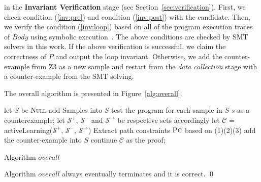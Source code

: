 \begin{itemize}
    in the \textbf{Invariant Verification} stage (see Section~\ref{sec:verification}). 
    First, we check condition (\ref{inv:pre}) and condition (\ref{inv:post}) with the candidate. 
    Then, we verify the condition (\ref{inv:loop}) 
    based on all of the program execution traces of $\mathit{Body}$ using symbolic execution~\cite{}. 
    The above conditions are checked by SMT~\cite{barrett2009satisfiability} solvers in this work. 
    If the above verification is successful, we claim the correctness of $P$ and output the loop invariant. 
    Otherwise, we add the counter-example from Z3 as a new sample 
    and restart from the \emph{data collection} stage with a counter-example from the SMT solving. 
\end{itemize}


The overall algorithm is presented in Figure~\ref{alg:overall}.
\begin{algorithm}[!h]
\SetAlgoVlined
\Indm
{}
\Indp
let $S$ be \textsc{Null}\;
 {
    add Samples into $S$\;
    test the program for each sample in $S$\;
     {
        \Return $s$ as a counterexample;
    }
    let $\mathcal{S}^+$, $\mathcal{S}^-$ and $\mathcal{S}^\rightarrow$ be respective sets accordingly\;
    let $\mathcal{C}$ = activeLearning($\mathcal{S}^+$, $\mathcal{S}^-$, $\mathcal{S}^\rightarrow$)\;
    Extract path constraints $\textsc{Pc}$ based on (1)(2)(3)\;
     {
         {
            add the counter-example into $S$\;
            continue\;
        }
    }
    \Return $\mathcal{C}$ as the proof;
}
\caption{Algorithm $overall$}
\label{alg:overall}
\end{algorithm}


\begin{theorem}
Algorithm $overall$ always eventually terminates and it is correct. \hfill \qed
\end{theorem}


